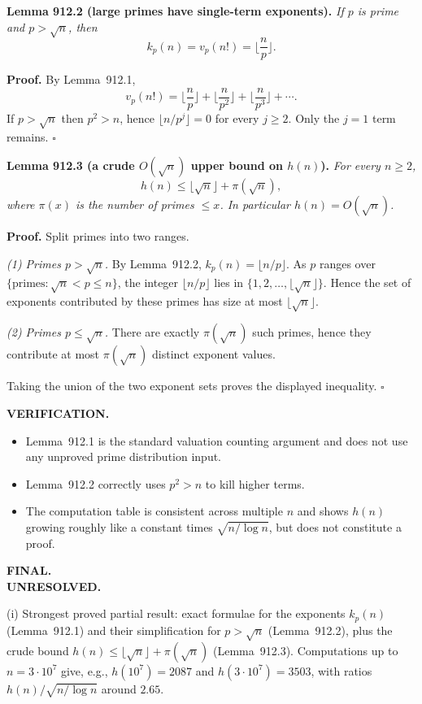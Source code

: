 \medskip
\noindent\textbf{Lemma 912.2 (large primes have single-term exponents).}  \emph{If $p$ is prime and $p>\sqrt{n}$, then}
\[
 k_p(n)=v_p(n!) = \Big\lfloor \frac{n}{p}\Big\rfloor.
\]

\noindent\textbf{Proof.} By Lemma~912.1,
\[
 v_p(n!)=\Big\lfloor \frac{n}{p}\Big\rfloor + \Big\lfloor \frac{n}{p^2}\Big\rfloor+\Big\lfloor \frac{n}{p^3}\Big\rfloor+\cdots.
\]
If $p>\sqrt{n}$ then $p^2>n$, hence $\lfloor n/p^j\rfloor=0$ for every $j\ge 2$. Only the $j=1$ term remains. \hfill$\square$

\medskip
\noindent\textbf{Lemma 912.3 (a crude $O(\sqrt n)$ upper bound on $h(n)$).}  \emph{For every $n\ge 2$,}
\[
 h(n) \le \lfloor \sqrt{n}\rfloor + \pi(\sqrt{n}),
\]
\emph{where $\pi(x)$ is the number of primes $\le x$. In particular $h(n)=O(\sqrt{n})$.}

\noindent\textbf{Proof.} Split primes into two ranges.

\emph{(1) Primes $p>\sqrt{n}$.} By Lemma~912.2, $k_p(n)=\lfloor n/p\rfloor$. As $p$ ranges over $\{\text{primes}:\sqrt{n}<p\le n\}$, the integer $\lfloor n/p\rfloor$ lies in $\{1,2,\dots,\lfloor\sqrt{n}\rfloor\}$. Hence the set of exponents contributed by these primes has size at most $\lfloor\sqrt{n}\rfloor$.

\emph{(2) Primes $p\le \sqrt{n}$.} There are exactly $\pi(\sqrt{n})$ such primes, hence they contribute at most $\pi(\sqrt{n})$ distinct exponent values.

Taking the union of the two exponent sets proves the displayed inequality. \hfill$\square$

\medskip
\noindent\textbf{VERIFICATION.}\\
\begin{itemize}
\item Lemma~912.1 is the standard valuation counting argument and does not use any unproved prime distribution input.
\item Lemma~912.2 correctly uses $p^2>n$ to kill higher terms.
\item The computation table is consistent across multiple $n$ and shows $h(n)$ growing roughly like a constant times $\sqrt{n/\log n}$, but does not constitute a proof.
\end{itemize}

\medskip
\noindent\textbf{FINAL.}\\
\textbf{UNRESOLVED.}

(i) Strongest proved partial result: exact formulae for the exponents $k_p(n)$ (Lemma~912.1) and their simplification for $p>\sqrt{n}$ (Lemma~912.2), plus the crude bound $h(n)\le \lfloor\sqrt n\rfloor+\pi(\sqrt n)$ (Lemma~912.3). Computations up to $n=3\cdot 10^7$ give, e.g., $h(10^7)=2087$ and $h(3\cdot 10^7)=3503$, with ratios $h(n)/\sqrt{n/\log n}$ around $2.65$.


